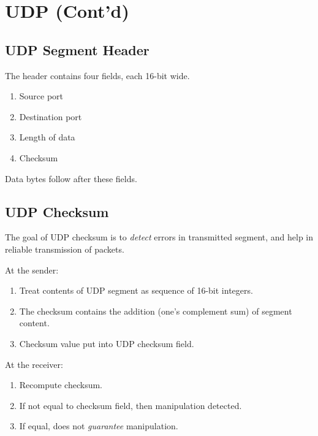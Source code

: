 \documentclass[twoside]{article}
\begin{document}



\section{UDP (Cont'd)}

\subsection{UDP Segment Header}

The header contains four fields, each 16-bit wide.

\begin{enumerate}
    \item Source port
    \item Destination port
    \item Length of data
    \item Checksum
\end{enumerate}

Data bytes follow after these fields.

\subsection{UDP Checksum}

The goal of UDP checksum is to \emph{detect} errors in transmitted segment, and help in reliable transmission of packets.

At the sender:

\begin{enumerate}
    \item Treat contents of UDP segment as sequence of 16-bit integers.
    \item The checksum contains the addition (one's complement sum) of segment content.
    \item Checksum value put into UDP checksum field.
\end{enumerate}

At the receiver:

\begin{enumerate}
    \item Recompute checksum.
    \item If not equal to checksum field, then manipulation detected.
    \item If equal, does not \emph{guarantee} manipulation.
\end{enumerate}
\end{document}
